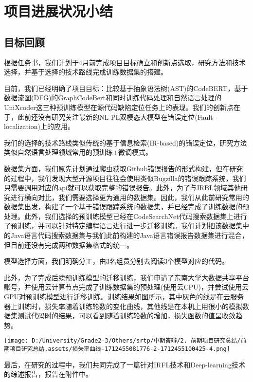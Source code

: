 \documentclass[
]{article}
\author{}
\date{}
\begin{document}
\section{项目进展状况小结}\label{ux9879ux76eeux8fdbux5c55ux72b6ux51b5ux5c0fux7ed3}

\subsection{目标回顾}\label{ux76eeux6807ux56deux987e}

根据任务书，我们计划于4月前完成项目目标确立和创新点选取，研究方法和技术选择，并基于选择的技术路线完成训练数据集的搭建。

目前，我们已经明确了项目目标：比较基于抽象语法树(AST)的CodeBERT，基于数据流图(DFG)的GraphCodeBert和同时训练代码处理和自然语言处理的UniXcoder这三种预训练模型在源代码缺陷定位任务上的表现。我们的创新点在于，此前还没有研究关注最新的NL-PL双模态大模型在错误定位(Fault-localization)上的应用。

我们的选择的技术路线类似传统的基于信息检索(IR-based)的错误定位，研究方法类似自然语言处理领域常用的预训练+微调模式。

数据集方面，我们原先计划通过爬虫获取Github错误报告的形式构建，但在研究的过程中，我们发现大型开源项目往往会使用类似Bugzilla的错误跟踪系统，我们只需要调用对应的api就可以获取完整的错误报告。此外，为了与IRBL领域其他研究进行横向对比，我们需要选择更为通用的数据集。因此，我们从此前研究常用的数据集出发，构建了一个基于错误跟踪系统的数据集，并已经完成了训练数据的预处理。此外，我们选择的预训练模型已经在CodeSearchNet代码搜索数据集上进行了预训练，并可以针对特定编程语言进行进一步迁移训练。我们计划把该数据集中的Java语言代码搜索数据集与我们此前构建的Java语言错误报告数据集进行混合，但目前还没有完成两种数据集格式的统一。

模型选择方面，我们明确分工，由3名组员分别去阅读3个模型对应的代码。

此外，为了完成后续预训练模型的迁移训练，我们申请了东南大学大数据共享平台账号，并使用云计算节点完成了训练数据集的预处理(使用云CPU)，并尝试使用云GPU对预训练模型进行迁移训练。训练结果如图所示，其中灰色的线是在云服务器上训练时，损失率随着训练轮数的变化曲线，其他线是在本机上用很小的模拟数据集测试代码时的结果，可以看到随着训练轮数的增加，损失函数的值呈收敛趋势。

\texttt{[image: D:/University/Grade2-3/Others/srtp/中期答辩/2. 前期项目研究总结/前期项目研究总结.assets/损失率曲线-1712455081776-2-1712455100425-4.png]}

最后，在研究的过程中，我们共同完成了一篇针对IRFL技术和Deep-learning技术的综述报告，报告在附件中。
\end{document}
